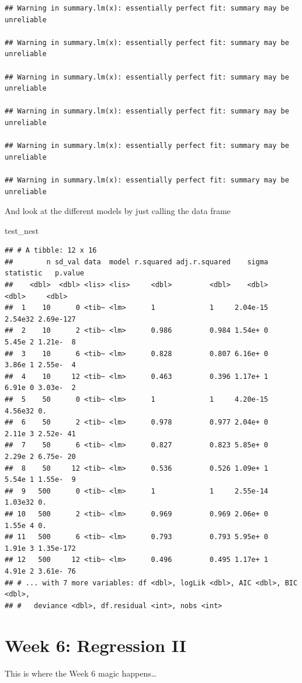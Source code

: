 \documentclass[
]{book}
\newenvironment{Shaded}{\begin{snugshade}}{\end{snugshade}}
\newcommand{\NormalTok}[1]{#1}
\begin{document}
\begin{verbatim}
## Warning in summary.lm(x): essentially perfect fit: summary may be unreliable

## Warning in summary.lm(x): essentially perfect fit: summary may be unreliable

## Warning in summary.lm(x): essentially perfect fit: summary may be unreliable

## Warning in summary.lm(x): essentially perfect fit: summary may be unreliable

## Warning in summary.lm(x): essentially perfect fit: summary may be unreliable

## Warning in summary.lm(x): essentially perfect fit: summary may be unreliable
\end{verbatim}

And look at the different models by just calling the data frame

\begin{Shaded}
\begin{Highlighting}[]
\NormalTok{test\_nest}
\end{Highlighting}
\end{Shaded}

\begin{verbatim}
## # A tibble: 12 x 16
##        n sd_val data  model r.squared adj.r.squared    sigma statistic   p.value
##    <dbl>  <dbl> <lis> <lis>     <dbl>         <dbl>    <dbl>     <dbl>     <dbl>
##  1    10      0 <tib~ <lm>      1             1     2.04e-15   2.54e32 2.69e-127
##  2    10      2 <tib~ <lm>      0.986         0.984 1.54e+ 0   5.45e 2 1.21e-  8
##  3    10      6 <tib~ <lm>      0.828         0.807 6.16e+ 0   3.86e 1 2.55e-  4
##  4    10     12 <tib~ <lm>      0.463         0.396 1.17e+ 1   6.91e 0 3.03e-  2
##  5    50      0 <tib~ <lm>      1             1     4.20e-15   4.56e32 0.       
##  6    50      2 <tib~ <lm>      0.978         0.977 2.04e+ 0   2.11e 3 2.52e- 41
##  7    50      6 <tib~ <lm>      0.827         0.823 5.85e+ 0   2.29e 2 6.75e- 20
##  8    50     12 <tib~ <lm>      0.536         0.526 1.09e+ 1   5.54e 1 1.55e-  9
##  9   500      0 <tib~ <lm>      1             1     2.55e-14   1.03e32 0.       
## 10   500      2 <tib~ <lm>      0.969         0.969 2.06e+ 0   1.55e 4 0.       
## 11   500      6 <tib~ <lm>      0.793         0.793 5.95e+ 0   1.91e 3 1.35e-172
## 12   500     12 <tib~ <lm>      0.496         0.495 1.17e+ 1   4.91e 2 3.61e- 76
## # ... with 7 more variables: df <dbl>, logLik <dbl>, AIC <dbl>, BIC <dbl>,
## #   deviance <dbl>, df.residual <int>, nobs <int>
\end{verbatim}

\hypertarget{week-6-regression-ii}{%
\chapter{Week 6: Regression II}\label{week-6-regression-ii}}

This is where the Week 6 magic happens\ldots{}

  
\end{document}
